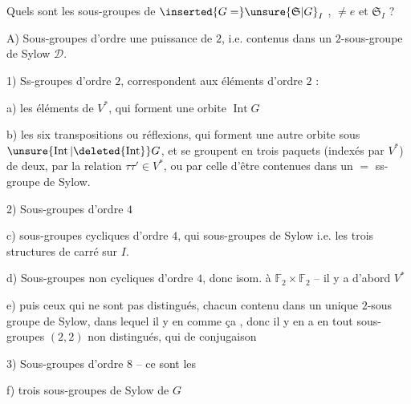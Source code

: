 
Quels sont les sous-groupes de $\inserted{G=}\unsure{\mathfrak S|G}_I$ , $\ne e$ et $\mathfrak S_I$ ?

A) Sous-groupes d'ordre une puissance de $2$, i.e. contenus dans un $2$-sous-groupe de Sylow $\mathcal D$.


1) Ss-groupes d'ordre $2$, correspondent aux éléments d'ordre $2$ :

a) les  éléments de $V^*$, qui forment une orbite  $\operatorname{Int}G$

b) les six transpositions ou réflexions, qui forment une autre orbite sous $\unsure{\operatorname{Int}|\deleted{\operatorname{Int}}}G$, et se groupent en trois paquets (indexés par $V^*$) de deux, par la relation $\tau\tau'\in V^*$, ou par celle d'être contenues dans un $=$ ss-groupe de Sylow.


2) Sous-groupes  d'ordre $4$

c)  sous-groupes cycliques d'ordre $4$, qui   sous-groupes de Sylow i.e. les trois structures de carré sur $I$.

d) Sous-groupes non cycliques d'ordre $4$, donc isom. à $\mathbb F_2\times\mathbb F_2$ -- il y a d'abord $V^*$

e) puis ceux qui ne sont pas distingués, chacun contenu dans un unique $2$-sous groupe de Sylow, dans lequel il y en   comme ça , donc il y en a en tout   sous-groupes  $(2,2)$ non distingués, qui    de conjugaison 

3) Sous-groupes d'ordre $8$ -- ce sont les

f) trois sous-groupes de Sylow de $G$


